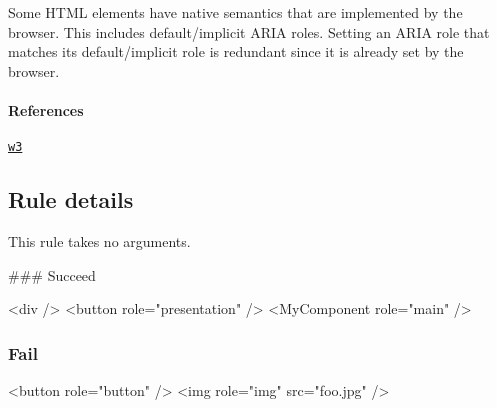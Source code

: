 Some H\+T\+ML elements have native semantics that are implemented by the browser. This includes default/implicit A\+R\+IA roles. Setting an A\+R\+IA role that matches its default/implicit role is redundant since it is already set by the browser.

\paragraph*{References}


\begin{DoxyEnumerate}
\item \href{https://www.w3.org/TR/html5/dom.html#aria-role-attribute}{\tt w3}
\end{DoxyEnumerate}

\subsection*{Rule details}

This rule takes no arguments.

\#\#\# Succeed 
\begin{DoxyCode}
<div />
<button role="presentation" />
<MyComponent role="main" />
\end{DoxyCode}


\subsubsection*{Fail}


\begin{DoxyCode}
<button role="button" />
<img role="img" src="foo.jpg" />
\end{DoxyCode}
 